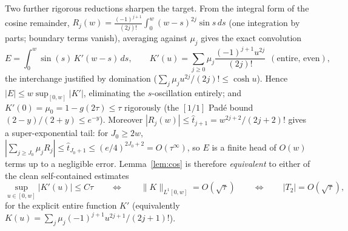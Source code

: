 Two further rigorous reductions sharpen the target. From the integral form of the cosine
remainder, $R_j(w)=\tfrac{(-1)^{j+1}}{(2j)!}\int_0^w(w-s)^{2j}\sin s\,ds$ (one integration
by parts; boundary terms vanish), averaging against $\mu_j$ gives the exact convolution
\begin{equation}\label{eq:conv}
  E=\int_0^w \sin(s)\,K'(w-s)\,ds,\qquad
  K'(u)=\sum_{j\ge0}\mu_j\frac{(-1)^{j+1}u^{2j}}{(2j)!}\ \ (\text{entire, even}),
\end{equation}
the interchange justified by domination ($\sum_j\mu_j u^{2j}/(2j)!\le\cosh u$). Hence
$|E|\le w\sup_{[0,w]}|K'|$, eliminating the $s$-oscillation entirely; and
$K'(0)=\mu_0=1-g(2\tau)\le\tau$ rigorously (the $[1/1]$ Pad\'e bound
$(2-y)/(2+y)\le e^{-y}$). Moreover $|R_j(w)|\le \hat t_{j+1}=w^{2j+2}/(2j+2)!$ gives a
super-exponential tail: for $J_0\ge2w$, $|\sum_{j\ge J_0}\mu_j R_j|\le\hat t_{J_0+1}
\le(e/4)^{2J_0+2}=O(\tau^{\infty})$, so $E$ is a finite head of $O(w)$ terms up to a
negligible error. Lemma~\ref{lem:cos} is therefore \emph{equivalent} to either of the clean
self-contained estimates
\[
  \sup_{u\in[0,w]}|K'(u)|\le C\tau
  \qquad\Longleftrightarrow\qquad
  \|K\|_{L^1[0,w]}=O(\sqrt\tau)
  \qquad\Longleftrightarrow\qquad
  |T_2|=O(\sqrt\tau),
\]
for the explicit entire function $K'$ (equivalently $K(u)=\sum_j\mu_j(-1)^{j+1}u^{2j+1}/(2j+1)!$).

